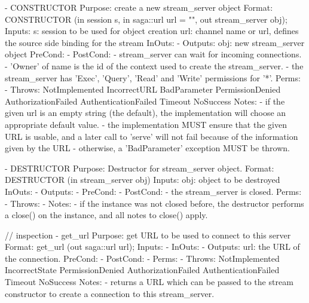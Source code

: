  
 \begin{myspec}
    - CONSTRUCTOR
      Purpose:  create a new stream_server object
      Format:   CONSTRUCTOR          (in  session   s,
                                      in  saga::url url = "",
                                      out stream_server obj);
      Inputs:   s:                    session to be used for
                                      object creation
                url:                  channel name or url,
                                      defines the source side
                                      binding for the stream
      InOuts:   -
      Outputs:  obj:                  new stream_server object
      PreCond:  -
      PostCond: - stream_server can wait for incoming
                  connections.
                - 'Owner' of name is the id of the context
                  used to create the stream_server.
                - the stream_server has 'Exec', 'Query', 'Read' 
                  and 'Write' permissions for '*'.
      Perms:    -
      Throws:   NotImplemented
                IncorrectURL
                BadParameter
                PermissionDenied
                AuthorizationFailed
                AuthenticationFailed
                Timeout
                NoSuccess
      Notes:    - if the given url is an empty string (the 
                  default), the implementation will choose an
                  appropriate default value.
                - the implementation MUST ensure that the given
                  URL is usable, and a later call to 'serve' 
                  will not fail because of the information given
                  by the URL - otherwise, a 'BadParameter'
                  exception MUST be thrown.
 
 
    - DESTRUCTOR
      Purpose:  Destructor for stream_server object.
      Format:   DESTRUCTOR           (in stream_server obj)
      Inputs:   obj:                  object to be destroyed
      InOuts:   -
      Outputs:  -
      PreCond:  -
      PostCond: - the stream_server is closed.
      Perms:    -
      Throws:   -
      Notes:    - if the instance was not closed before, the 
                  destructor performs a close() on the instance,
                  and all notes to close() apply.
 
    // inspection
    - get_url
      Purpose:  get URL to be used to connect to this server
      Format:   get_url              (out saga::url url);
      Inputs:   -
      InOuts:   -
      Outputs:  url:                  the URL of the connection.
      PreCond:  -
      PostCond: -
      Perms:    -
      Throws:   NotImplemented
                IncorrectState
                PermissionDenied
                AuthorizationFailed
                AuthenticationFailed
                Timeout
                NoSuccess
      Notes:    - returns a URL which can be passed to
                  the stream constructor to create a connection
                  to this stream_server.
      

\end{myspec}

